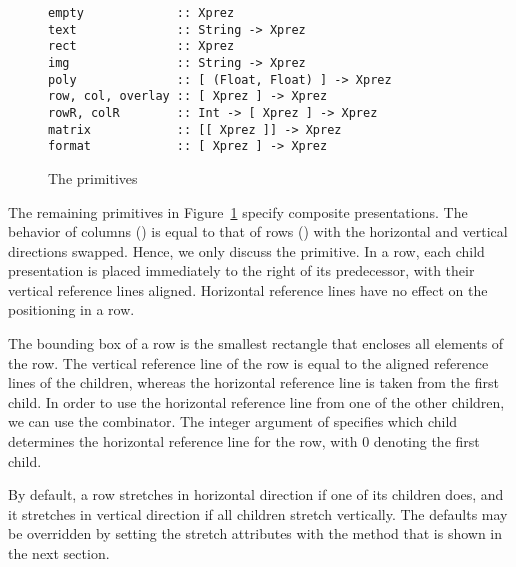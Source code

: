 \begin{figure}
\begin{small}
\begin{center}
\begin{small}
\begin{verbatim}
empty             :: Xprez
text              :: String -> Xprez             
rect              :: Xprez                       
img               :: String -> Xprez             
poly              :: [ (Float, Float) ] -> Xprez 
row, col, overlay :: [ Xprez ] -> Xprez          
rowR, colR        :: Int -> [ Xprez ] -> Xprez   
matrix            :: [[ Xprez ]] -> Xprez
format            :: [ Xprez ] -> Xprez
\end{verbatim}
\end{small}
\caption{The {\Xprez} primitives} \label{xprezprim} 
\end{center}
\end{small}
\end{figure}


The remaining primitives in Figure~\ref{xprezprim} specify composite presentations. The behavior of columns () is equal to that of rows () with the horizontal and vertical directions swapped. Hence, we only discuss the  primitive. In a row, each child presentation is placed immediately to the right of its predecessor, with their vertical reference lines aligned. Horizontal reference lines have no effect on the positioning in a row.

\begin{center}
\end{center}

The bounding box of a row is the smallest rectangle that encloses all elements of the row. The vertical reference line of the row is equal to the aligned reference lines of the children, whereas the horizontal reference line is taken from the first child. In order to use the horizontal reference line from one of the other children, we can use the  combinator. The integer argument of  specifies which child determines the horizontal reference line for the row, with 0 denoting the first child. 

By default, a row stretches in horizontal direction if one of its children does, and it stretches in vertical direction if all children stretch vertically. The defaults may be overridden by setting the stretch attributes with the method that is  shown in the next section. 

